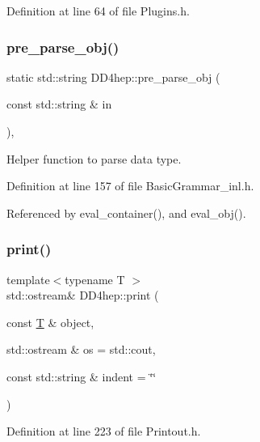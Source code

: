 Definition at line 64 of file Plugins.\+h.

\hypertarget{namespace_d_d4hep_a756006d9d570012647e8d27cbe3d1f33}{}\label{namespace_d_d4hep_a756006d9d570012647e8d27cbe3d1f33} 
\subsubsection{\texorpdfstring{pre\+\_\+parse\+\_\+obj()}{pre\_parse\_obj()}}
{\footnotesize\ttfamily static std\+::string D\+D4hep\+::pre\+\_\+parse\+\_\+obj (\begin{DoxyParamCaption}\item[{const std\+::string \&}]{in }\end{DoxyParamCaption})\hspace{0.3cm}{\ttfamily [inline]}, {\ttfamily [static]}}



Helper function to parse data type. 



Definition at line 157 of file Basic\+Grammar\+\_\+inl.\+h.



Referenced by eval\+\_\+container(), and eval\+\_\+obj().

\hypertarget{namespace_d_d4hep_a373ecb4c3eb0d0e6f3620bbc856a658b}{}\label{namespace_d_d4hep_a373ecb4c3eb0d0e6f3620bbc856a658b} 
\subsubsection{\texorpdfstring{print()}{print()}}
{\footnotesize\ttfamily template$<$typename T $>$ \\
std\+::ostream\& D\+D4hep\+::print (\begin{DoxyParamCaption}\item[{const \hyperlink{class_t}{T} \&}]{object,  }\item[{std\+::ostream \&}]{os = {\ttfamily std\+:\+:cout},  }\item[{const std\+::string \&}]{indent = {\ttfamily \char`\"{}\char`\"{}} }\end{DoxyParamCaption})\hspace{0.3cm}{\ttfamily [inline]}}



Definition at line 223 of file Printout.\+h.



